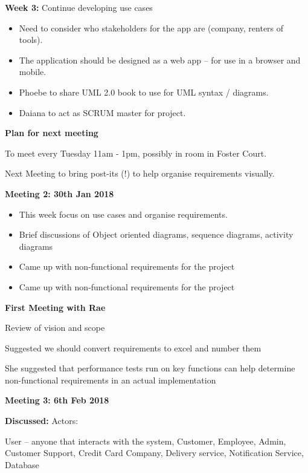 \textbf{Week 3:} Continue developing use cases

\begin{itemize}
  \item Need to consider who stakeholders for the app are (company, renters of tools).
  \item The application should be designed as a web app – for use in a browser and mobile.
  \item Phoebe to share UML 2.0 book to use for UML syntax / diagrams.
  \item Daiana to act as SCRUM master for project.


\end{itemize}


\textbf{Plan for next meeting}

To meet every Tuesday 11am - 1pm, possibly in room in Foster Court.

Next Meeting to bring post-its (!) to help organise requirements visually.

\textbf{Meeting 2: 30th Jan 2018}



\begin{itemize}
  \item This week focus on use cases and organise requirements.
  \item Brief discussions of Object oriented diagrams, sequence diagrams, activity diagrams
  \item Came up with non-functional requirements for the project
  \item Came up with non-functional requirements for the project
 
\end{itemize}



\textbf{First Meeting with Rae}

Review of vision and scope

Suggested we should convert requirements to excel and number them

She suggested that performance tests run on key functions can help determine non-functional requirements in an actual implementation

\textbf{Meeting 3: 6th Feb 2018}

\textbf{Discussed:}
Actors:

User – anyone that interacts with the system, Customer, Employee, Admin, Customer Support, Credit Card Company, Delivery service, Notification Service, Database

